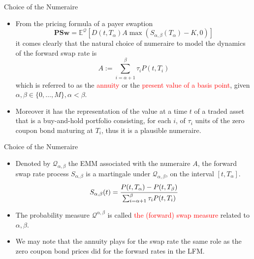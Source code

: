\documentclass{beamer}
\begin{document}
\begin{frame}{Choice of the Numeraire}
	\begin{itemize}
		\item<1-> From the pricing formula of a payer swaption
		\begin{equation*}
			\textbf{PSw}=\mathbb{E}^{\mathcal{Q}}\left[D(t,T_\alpha)A\max(S_{\alpha,\beta}(T_\alpha)-K, 0)\right]
		\end{equation*}
		it comes clearly that the natural choice of numeraire to model the dynamics of the forward swap rate is
		\begin{equation*}
			A := \sum^\beta_{i=\alpha+1}\tau_i P(t, T_i)
		\end{equation*}
		which is referred to as the \textcolor{red}{annuity} or the \textcolor{red}{present value of a basis point}, given $\alpha, \beta \in \{0,\ldots, M\}, \alpha < \beta$. 
	  \item<2-> Moreover it has the representation of the value at a time $t$ of a traded asset that is a buy-and-hold portfolio consisting, for each $i$, of $\tau_i$ units of the zero coupon bond maturing at $T_i$, thus it is a plausible numeraire.
	\end{itemize}
\end{frame}

\begin{frame}{Choice of the Numeraire}
  \begin{itemize}
  \item<1-> Denoted by $\mathcal{Q}_{\alpha,\beta}$ the EMM associated with the numeraire $A$, the forward swap rate process $S_{\alpha,\beta}$ is a martingale under $\mathcal{Q}_{\alpha,\beta}$, on the interval $[t, T_\alpha]$.
  \begin{equation*}
  	S_{\alpha,\beta}(t) = \cfrac{P(t,T_\alpha)-P(t,T_\beta)}{\sum_{i=\alpha+1}^{\beta}\tau_iP(t,T_i)}
  \end{equation*}
  \item<2-> The probability measure $\mathcal{Q}^{\alpha,\beta}$ is called \textcolor{red}{the (forward) swap measure} related to $\alpha, \beta$.
  \item<2-> We may note that the annuity plays for the swap rate the same role as the zero coupon bond prices did for the forward rates in the LFM. 
  \end{itemize}
\end{frame}
\end{document}
